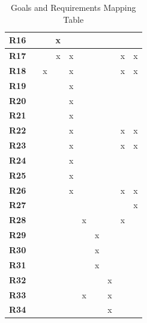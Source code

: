 \begin{table}[H]
\begin{tabular}{|c|c|c|c|c|c|c|c|c|c|}
        \textbf{R16} &   &   & x &   &   &   &   &   &   \\ \hline
        \textbf{R17} &   &   & x & x &   &   &   & x & x \\ \hline
        \textbf{R18} &   & x &   & x &   &   &   & x & x \\ \hline
        \textbf{R19} &   &   &   & x &   &   &   &   &   \\ \hline
        \textbf{R20} &   &   &   & x &   &   &   &   &   \\ \hline
        \textbf{R21} &   &   &   & x &   &   &   &   &   \\ \hline
        \textbf{R22} &   &   &   & x &   &   &   & x & x \\ \hline
        \textbf{R23} &   &   &   & x &   &   &   & x & x \\ \hline
        \textbf{R24} &   &   &   & x &   &   &   &   &   \\ \hline
        \textbf{R25} &   &   &   & x &   &   &   &   &   \\ \hline
        \textbf{R26} &   &   &   & x &   &   &   & x & x \\ \hline
        \textbf{R27} &   &   &   &   &   &   &   &   & x \\ \hline
        \textbf{R28} &   &   &   &   & x &   &   & x &   \\ \hline
        \textbf{R29} &   &   &   &   &   & x &   &   &   \\ \hline
        \textbf{R30} &   &   &   &   &   & x &   &   &   \\ \hline
        \textbf{R31} &   &   &   &   &   & x &   &   &   \\ \hline
        \textbf{R32} &   &   &   &   &   &   & x &   &   \\ \hline
        \textbf{R33} &   &   &   &   & x &   & x &   &   \\ \hline
        \textbf{R34} &   &   &   &   &   &   & x &   &   \\ \hline
    \end{tabular}
    \caption{Goals and Requirements Mapping Table}
    \label{tab:requirements_mapping}
\end{table}
\clearpage 
